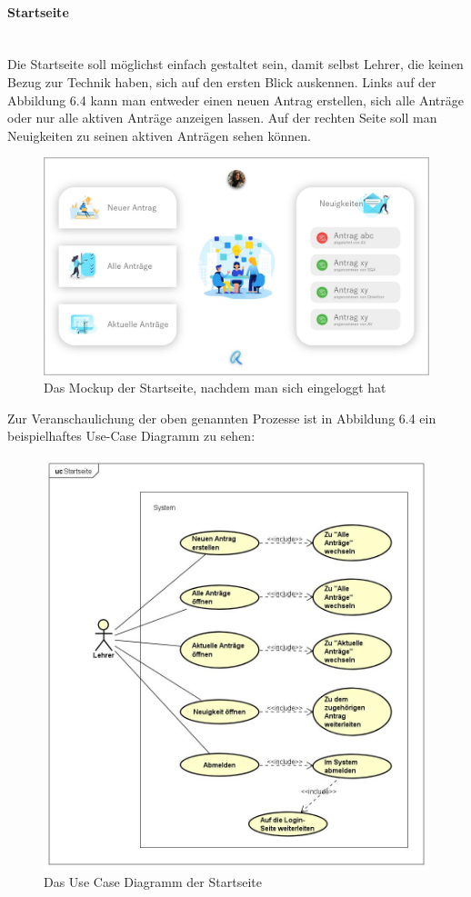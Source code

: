 \paragraph{Startseite}
~\\
Die Startseite soll möglichst einfach gestaltet sein, damit selbst Lehrer, die keinen Bezug zur Technik haben, sich auf den ersten Blick auskennen. Links auf der Abbildung 6.4 kann man entweder einen neuen Antrag erstellen, sich alle Anträge oder nur alle aktiven Anträge anzeigen lassen. Auf der rechten Seite soll man Neuigkeiten zu seinen aktiven Anträgen sehen können.
\begin{figure}[H]
	\centering
	\includegraphics[width=1\linewidth]{images/Mockup-Startseite-eingeloggt}
	\caption[Mockup Startseite]{Das Mockup der Startseite, nachdem man sich eingeloggt hat}
	\label{fig:mockupStart}
\end{figure}
Zur Veranschaulichung der oben genannten Prozesse ist in Abbildung 6.4 ein beispielhaftes Use-Case Diagramm zu sehen: 
\begin{figure}[H]
	\centering
	\includegraphics[width=1\linewidth]{images/uc-start}
	\caption[Use Case Diagramm Login]{Das Use Case Diagramm der Startseite}
	\label{fig:ucStart}
\end{figure}
